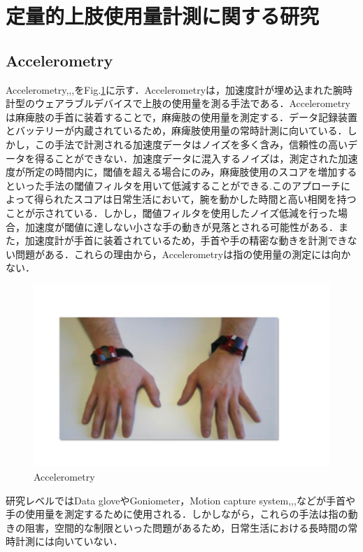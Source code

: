 \section{定量的上肢使用量計測に関する研究}
\subsection*{Accelerometry}
Accelerometry\cite{Chen2005},\cite{Hayward2016},\cite{Dwiputra2017},\cite{VanDerPas2011}をFig.\ref{fig:Accelerometry}に示す．Accelerometryは，加速度計が埋め込まれた腕時計型のウェアラブルデバイスで上肢の使用量を測る手法である．Accelerometryは麻痺肢の手首に装着することで，麻痺肢の使用量を測定する．データ記録装置とバッテリーが内蔵されているため，麻痺肢使用量の常時計測に向いている\cite{VanDerPas2011}．しかし，この手法で計測される加速度データはノイズを多く含み，信頼性の高いデータを得ることができない．加速度データに混入するノイズは，測定された加速度が所定の時間内に，閾値を超える場合にのみ，麻痺肢使用のスコアを増加するといった手法の閾値フィルタを用いて低減することができる.このアプローチによって得られたスコアは日常生活において，腕を動かした時間と高い相関を持つことが示されている．しかし，閾値フィルタを使用したノイズ低減を行った場合，加速度が閾値に達しない小さな手の動きが見落とされる可能性がある．また，加速度計が手首に装着されているため，手首や手の精密な動きを計測できない問題がある．これらの理由から，Accelerometryは指の使用量の測定には向かない\cite{Uswatte2000}．

\begin{figure}[H]
  \centering
  \includegraphics[width=0.8\linewidth]{fig/ch1/acc}
  \caption{Accelerometry}
  \label{fig:Accelerometry}
\end{figure}

研究レベルではData gloveやGoniometer，Motion capture system\cite{Binh2014},\cite{Valtin2017},\cite{Chen2003},\cite{Ren2011}などが手首や手の使用量を測定するために使用される．しかしながら，これらの手法は指の動きの阻害，空間的な制限といった問題があるため，日常生活における長時間の常時計測には向いていない．


